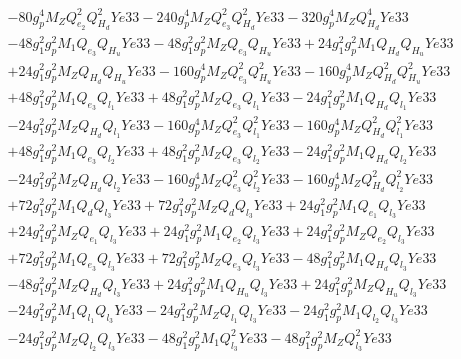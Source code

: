 \begin{align}
 &-80 g_{p}^{4} M_Z Q_{e_{2}}^{2} Q_{H_d}^{2} Ye33 -240 g_{p}^{4} M_Z Q_{e_3}^{2} Q_{H_d}^{2} Ye33 -320 g_{p}^{4} M_Z Q_{H_d}^{4} Ye33 \nonumber \\ 
 &-48 g_{1}^{2} g_{p}^{2} M_1 Q_{e_3} Q_{H_u} Ye33 -48 g_{1}^{2} g_{p}^{2} M_Z Q_{e_3} Q_{H_u} Ye33 +24 g_{1}^{2} g_{p}^{2} M_1 Q_{H_d} Q_{H_u} Ye33 \nonumber \\ 
 &+24 g_{1}^{2} g_{p}^{2} M_Z Q_{H_d} Q_{H_u} Ye33 -160 g_{p}^{4} M_Z Q_{e_3}^{2} Q_{H_u}^{2} Ye33 -160 g_{p}^{4} M_Z Q_{H_d}^{2} Q_{H_u}^{2} Ye33 \nonumber \\ 
 &+48 g_{1}^{2} g_{p}^{2} M_1 Q_{e_3} Q_{l_1} Ye33 +48 g_{1}^{2} g_{p}^{2} M_Z Q_{e_3} Q_{l_1} Ye33 -24 g_{1}^{2} g_{p}^{2} M_1 Q_{H_d} Q_{l_1} Ye33 \nonumber \\ 
 &-24 g_{1}^{2} g_{p}^{2} M_Z Q_{H_d} Q_{l_1} Ye33 -160 g_{p}^{4} M_Z Q_{e_3}^{2} Q_{l_1}^{2} Ye33 -160 g_{p}^{4} M_Z Q_{H_d}^{2} Q_{l_1}^{2} Ye33 \nonumber \\ 
 &+48 g_{1}^{2} g_{p}^{2} M_1 Q_{e_3} Q_{l_2} Ye33 +48 g_{1}^{2} g_{p}^{2} M_Z Q_{e_3} Q_{l_2} Ye33 -24 g_{1}^{2} g_{p}^{2} M_1 Q_{H_d} Q_{l_2} Ye33 \nonumber \\ 
 &-24 g_{1}^{2} g_{p}^{2} M_Z Q_{H_d} Q_{l_2} Ye33 -160 g_{p}^{4} M_Z Q_{e_3}^{2} Q_{l_2}^{2} Ye33 -160 g_{p}^{4} M_Z Q_{H_d}^{2} Q_{l_2}^{2} Ye33 \nonumber \\ 
 &+72 g_{1}^{2} g_{p}^{2} M_1 Q_{d} Q_{l_3} Ye33 +72 g_{1}^{2} g_{p}^{2} M_Z Q_{d} Q_{l_3} Ye33 +24 g_{1}^{2} g_{p}^{2} M_1 Q_{e_{1}} Q_{l_3} Ye33 \nonumber \\ 
 &+24 g_{1}^{2} g_{p}^{2} M_Z Q_{e_{1}} Q_{l_3} Ye33 +24 g_{1}^{2} g_{p}^{2} M_1 Q_{e_{2}} Q_{l_3} Ye33 +24 g_{1}^{2} g_{p}^{2} M_Z Q_{e_{2}} Q_{l_3} Ye33 \nonumber \\ 
 &+72 g_{1}^{2} g_{p}^{2} M_1 Q_{e_3} Q_{l_3} Ye33 +72 g_{1}^{2} g_{p}^{2} M_Z Q_{e_3} Q_{l_3} Ye33 -48 g_{1}^{2} g_{p}^{2} M_1 Q_{H_d} Q_{l_3} Ye33 \nonumber \\ 
 &-48 g_{1}^{2} g_{p}^{2} M_Z Q_{H_d} Q_{l_3} Ye33 +24 g_{1}^{2} g_{p}^{2} M_1 Q_{H_u} Q_{l_3} Ye33 +24 g_{1}^{2} g_{p}^{2} M_Z Q_{H_u} Q_{l_3} Ye33 \nonumber \\ 
 &-24 g_{1}^{2} g_{p}^{2} M_1 Q_{l_1} Q_{l_3} Ye33 -24 g_{1}^{2} g_{p}^{2} M_Z Q_{l_1} Q_{l_3} Ye33 -24 g_{1}^{2} g_{p}^{2} M_1 Q_{l_2} Q_{l_3} Ye33 \nonumber \\ 
 &-24 g_{1}^{2} g_{p}^{2} M_Z Q_{l_2} Q_{l_3} Ye33 -48 g_{1}^{2} g_{p}^{2} M_1 Q_{l_3}^{2} Ye33 -48 g_{1}^{2} g_{p}^{2} M_Z Q_{l_3}^{2} Ye33 \nonumber \\ 

\end{align}
